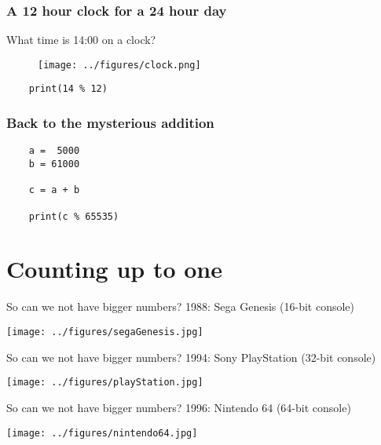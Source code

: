 \documentclass[xcolor=dvipsnames]{beamer}
\begin{document}
\begin{frame}[fragile]
  \frametitle{A 12 hour clock for a 24 hour day}
  What time is 14:00 on a clock?
  \begin{figure}
    \centering
    \texttt{[image: ../figures/clock.png]}
  \end{figure}
  \begin{lstlisting}
    print(14 % 12)
  \end{lstlisting}
\end{frame}


\begin{frame}[fragile]
  \frametitle{Back to the mysterious addition}
  \begin{lstlisting}
    a =  5000
    b = 61000

    c = a + b

    print(c % 65535)
  \end{lstlisting}
\end{frame}


\section{Counting up to one}


\begin{frame}{So can we not have bigger numbers?}
  1988: Sega Genesis (16-bit console)
  \begin{center}
    \texttt{[image: ../figures/segaGenesis.jpg]}
  \end{center}
\end{frame}


\begin{frame}{So can we not have bigger numbers?}
  1994: Sony PlayStation (32-bit console)
  \begin{center}
    \texttt{[image: ../figures/playStation.jpg]}
  \end{center}
\end{frame}


\begin{frame}{So can we not have bigger numbers?}
  1996: Nintendo 64 (64-bit console)
  \begin{center}
    \texttt{[image: ../figures/nintendo64.jpg]}
  \end{center}
\end{frame}
\end{document}
